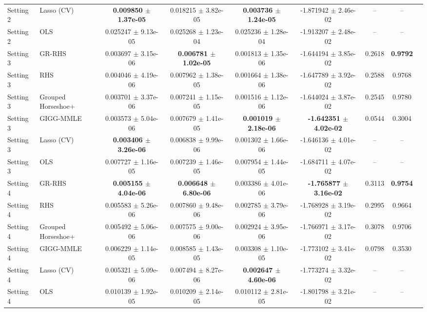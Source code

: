 \documentclass[11pt]{article}
\begin{document}
\begin{table}[p]
\begin{adjustbox}{max width=\textwidth}
\begin{tabular}{llccccccc}
Setting 2 & Lasso (CV) & \textbf{0.009850 $\pm$ 1.37e-05} & 0.018215 $\pm$ 3.82e-05 & \textbf{0.003736 $\pm$ 1.24e-05} & -1.871942 $\pm$ 2.46e-02 & -- & -- \\
Setting 2 & OLS & 0.025247 $\pm$ 9.13e-05 & 0.025268 $\pm$ 1.23e-04 & 0.025236 $\pm$ 1.28e-04 & -1.913207 $\pm$ 2.48e-02 & -- & -- \\
\midrule
Setting 3 & GR-RHS & 0.003697 $\pm$ 3.15e-06 & \textbf{0.006781 $\pm$ 1.02e-05} & 0.001813 $\pm$ 1.35e-06 & -1.644194 $\pm$ 3.85e-02 & 0.2618 & \textbf{0.9792} \\
Setting 3 & RHS & 0.004046 $\pm$ 4.19e-06 & 0.007962 $\pm$ 1.38e-05 & 0.001664 $\pm$ 1.38e-06 & -1.647789 $\pm$ 3.92e-02 & 0.2588 & 0.9768 \\
Setting 3 & Grouped Horseshoe+ & 0.003701 $\pm$ 3.37e-06 & 0.007241 $\pm$ 1.15e-05 & 0.001516 $\pm$ 1.12e-06 & -1.644024 $\pm$ 3.87e-02 & 0.2545 & 0.9780 \\
Setting 3 & GIGG-MMLE & 0.003573 $\pm$ 5.04e-06 & 0.007679 $\pm$ 1.41e-05 & \textbf{0.001019 $\pm$ 2.18e-06} & \textbf{-1.642351 $\pm$ 4.02e-02} & 0.0544 & 0.3004 \\
Setting 3 & Lasso (CV) & \textbf{0.003406 $\pm$ 3.26e-06} & 0.006838 $\pm$ 9.99e-06 & 0.001302 $\pm$ 1.66e-06 & -1.646136 $\pm$ 4.01e-02 & -- & -- \\
Setting 3 & OLS & 0.007727 $\pm$ 1.16e-05 & 0.007239 $\pm$ 1.46e-05 & 0.007954 $\pm$ 1.44e-05 & -1.684711 $\pm$ 4.07e-02 & -- & -- \\
\midrule
Setting 4 & GR-RHS & \textbf{0.005155 $\pm$ 4.04e-06} & \textbf{0.006648 $\pm$ 6.80e-06} & 0.003386 $\pm$ 4.01e-06 & \textbf{-1.765877 $\pm$ 3.16e-02} & 0.3113 & \textbf{0.9754} \\
Setting 4 & RHS & 0.005583 $\pm$ 5.26e-06 & 0.007860 $\pm$ 9.48e-06 & 0.002785 $\pm$ 3.79e-06 & -1.768928 $\pm$ 3.19e-02 & 0.2995 & 0.9664 \\
Setting 4 & Grouped Horseshoe+ & 0.005492 $\pm$ 5.06e-06 & 0.007575 $\pm$ 9.00e-06 & 0.002924 $\pm$ 3.95e-06 & -1.766971 $\pm$ 3.17e-02 & 0.3078 & 0.9706 \\
Setting 4 & GIGG-MMLE & 0.006229 $\pm$ 1.14e-05 & 0.008585 $\pm$ 1.43e-05 & 0.003308 $\pm$ 1.10e-05 & -1.773102 $\pm$ 3.41e-02 & 0.0798 & 0.3530 \\
Setting 4 & Lasso (CV) & 0.005321 $\pm$ 5.09e-06 & 0.007494 $\pm$ 8.27e-06 & \textbf{0.002647 $\pm$ 4.60e-06} & -1.773274 $\pm$ 3.32e-02 & -- & -- \\
Setting 4 & OLS & 0.010139 $\pm$ 1.92e-05 & 0.010209 $\pm$ 2.14e-05 & 0.010112 $\pm$ 2.81e-05 & -1.801798 $\pm$ 3.21e-02 & -- & -- \\

\end{tabular}
\end{adjustbox}
\end{table}
\end{document}
